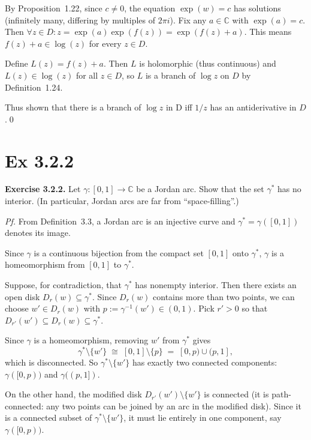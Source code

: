 \documentclass[a4paper]{article}
\begin{document}
\medskip
By Proposition~1.22, since $c \neq 0$, the equation $\exp(w) = c$ has solutions (infinitely many, differing by multiples of $2\pi i$). Fix any $a \in \mathbb{C}$ with $\exp(a) = c$. Then $\forall z \in D: z = \exp(a) \exp(f(z)) = \exp(f(z) + a)$. This means $f(z) + a \in \log(z)$ for every $z \in D$. 

\medskip
Define $L(z) = f(z) + a$. Then $L$ is holomorphic (thus continuous) and $L(z) \in \log(z)$ for all $z \in D$, so $L$ is a branch of $\log z$ on $D$ by Definition~1.24. 

\medskip
Thus shown that there is a branch of $\log z$ in D iff $1/z$ has an antiderivative in $D$.\qed

\newpage

\section*{Ex 3.2.2}

\begin{tcolorbox}[colback=gray!10, colframe=black, boxrule=0.5pt, arc=2mm]
\textbf{Exercise 3.2.2.} Let $\gamma : [0,1] \to \mathbb{C}$ be a Jordan arc. Show that the set $\gamma^*$ has no interior. (In particular, Jordan arcs are far from ``space-filling''.)
\end{tcolorbox}


\textit{Pf.} From Definition~3.3, a Jordan arc is an injective curve and $\gamma^*= \gamma([0,1])$ denotes its image. 

\medskip
Since $\gamma$ is a continuous bijection from the compact set $[0,1]$ onto $\gamma^*$, $\gamma$ is a homeomorphism from $[0,1]$ to $\gamma^*$.

\medskip
Suppose, for contradiction, that $\gamma^*$ has nonempty interior. Then there exists an open disk $D_r(w) \subseteq \gamma^*$. Since $D_r(w)$ contains more than two points, we can choose $w' \in D_r(w)$ with $p := \gamma^{-1}(w') \in (0,1)$. Pick $r' > 0$ so that $D_{r'}(w') \subseteq D_r(w) \subseteq \gamma^*$.

\medskip
Since $\gamma$ is a homeomorphism, removing $w'$ from $\gamma^*$ gives
\[
\gamma^* \setminus \{w'\} \;\cong\; [0,1] \setminus \{p\} \;=\; [0,p) \cup (p,1],
\]
which is disconnected. So $\gamma^* \setminus \{w'\}$ has exactly two connected components: $\gamma([0,p))$ and $\gamma((p,1])$.

\medskip
On the other hand, the modified disk $D_{r'}(w') \setminus \{w'\}$ is connected (it is path-connected: any two points can be joined by an arc in the modified disk). Since it is a connected subset of $\gamma^* \setminus \{w'\}$, it must lie entirely in one component, say $\gamma([0,p))$.
\end{document}
